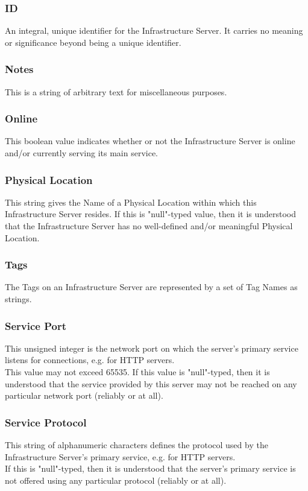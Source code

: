 \subsubsection{ID}
An integral, unique identifier for the Infrastructure Server. It carries no
meaning or significance beyond being a unique identifier.

\subsubsection{Notes}
This is a string of arbitrary text for miscellaneous purposes.

\subsubsection{Online}
This boolean value indicates whether or not the Infrastructure Server is online
and/or currently serving its main service.

\subsubsection{Physical Location}
This string gives the Name of a Physical Location within which this
Infrastructure Server resides. If this is "null"-typed value, then it is
understood that the Infrastructure Server has no well-defined and/or
meaningful Physical Location.

\subsubsection{Tags}
The Tags on an Infrastructure Server are represented by a set of Tag Names as
strings.

\subsubsection{Service Port}
This unsigned integer is the network port on which the server's primary service
listens for connections, e.g.  for HTTP servers.\\
This value may not exceed 65535. If this value is "null"-typed, then it is
understood that the service provided by this server may not be reached on any
particular network port (reliably or at all).

\subsubsection{Service Protocol}
This string of alphanumeric characters defines the protocol used by the
Infrastructure Server's primary service, e.g.  for HTTP servers.\\
If this is "null"-typed, then it is understood that the server's primary service
is not offered using any particular protocol (reliably or at all).
